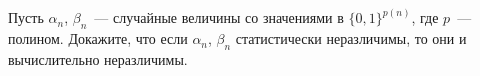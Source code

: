 Пусть $\alpha_n$, $\beta_n$~--- случайные величины со значениями в $\{0, 1\}^{p(n)}$, где $p$~---
полином. Докажите, что если $\alpha_n$, $\beta_n$ статистически неразличимы, то они и вычислительно
неразличимы.

